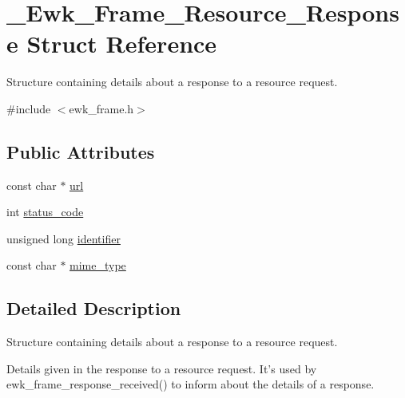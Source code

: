 \hypertarget{struct__Ewk__Frame__Resource__Response}{\section{\+\_\+\+Ewk\+\_\+\+Frame\+\_\+\+Resource\+\_\+\+Response Struct Reference}
\label{struct__Ewk__Frame__Resource__Response}
}


Structure containing details about a response to a resource request.  




{\ttfamily \#include $<$ewk\+\_\+frame.\+h$>$}

\subsection*{Public Attributes}
\begin{DoxyCompactItemize}
\item 
const char $\ast$ \hyperlink{struct__Ewk__Frame__Resource__Response_a581ef38fb862f814b740c05b85157ad4}{url}
\item 
int \hyperlink{struct__Ewk__Frame__Resource__Response_a537e04942bf797a15692105f24e9a62b}{status\+\_\+code}
\item 
unsigned long \hyperlink{struct__Ewk__Frame__Resource__Response_a0a8dcacfdbe2400241c2d90c4370d6ac}{identifier}
\item 
const char $\ast$ \hyperlink{struct__Ewk__Frame__Resource__Response_a83028985924c37eb03a05e1232e739ca}{mime\+\_\+type}
\end{DoxyCompactItemize}


\subsection{Detailed Description}
Structure containing details about a response to a resource request. 

Details given in the response to a resource request. It's used by ewk\+\_\+frame\+\_\+response\+\_\+received() to inform about the details of a response. 

